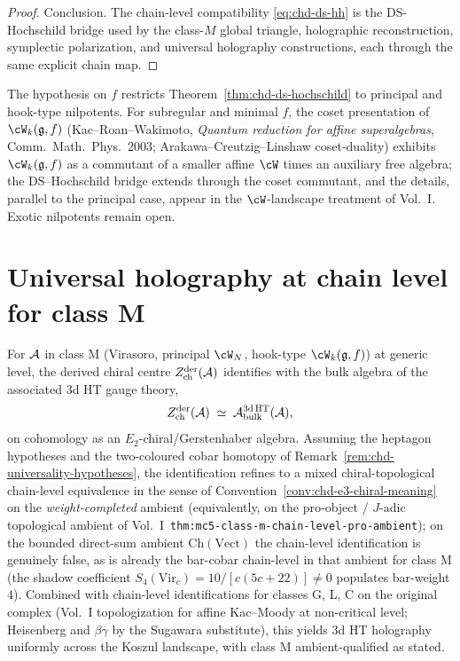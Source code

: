 \begin{proof}
Conclusion. The chain-level compatibility \eqref{eq:chd-ds-hh} is the
DS-Hochschild bridge used by the class-$M$ global triangle,
holographic reconstruction, symplectic polarization, and universal
holography constructions, each through the same explicit chain map.
\end{proof}

\begin{remark}%
\label{rem:chd-nonprincipal-nilpotents}%
The hypothesis on $f$ restricts Theorem~\ref{thm:chd-ds-hochschild} to
principal and hook-type nilpotents. For subregular and minimal $f$,
the coset presentation of $\cW_k(\fg,f)$ (Kac--Roan--Wakimoto,
\emph{Quantum reduction for affine superalgebras}, Comm.~Math.~Phys.\
2003; Arakawa--Creutzig--Linshaw coset-duality) exhibits
$\cW_k(\fg,f)$ as a commutant of a smaller affine $\cW$ times an
auxiliary free algebra; the DS--Hochschild bridge extends through the
coset commutant, and the details, parallel to the principal case,
appear in the $\cW$-landscape treatment of Vol.~I. Exotic nilpotents
remain open.
\end{remark}

\section{Universal holography at chain level for class M}
\label{sec:chd-holography}

\begin{corollary}%
\label{cor:universal-holography-class-M}%
%
For $\mathcal{A}$ in class M (Virasoro, principal $\cW_N$, hook-type
$\cW_k(\fg, f)$) at generic level, the derived chiral centre
$Z^{\mathrm{der}}_{\mathrm{ch}}(\mathcal{A})$ identifies with the bulk algebra
of the associated 3d HT gauge theory,
\[
 Z^{\mathrm{der}}_{\mathrm{ch}}(\mathcal{A}) \;\simeq\;
 \mathcal{A}_{\mathrm{bulk}}^{\mathrm{3d\,HT}}(\mathcal{A}),
\]
on cohomology as an $E_2$-chiral/Gerstenhaber algebra. Assuming the
heptagon hypotheses and the two-coloured cobar homotopy of
Remark~\ref{rem:chd-universality-hypotheses}, the identification
refines to a mixed chiral-topological chain-level equivalence in the
sense of Convention~\ref{conv:chd-e3-chiral-meaning} on the
\emph{weight-completed} ambient (equivalently, on the pro-object /
$J$-adic topological ambient of
Vol.~I~\texttt{thm:mc5-class-m-chain-level-pro-ambient}); on the
bounded direct-sum ambient $\mathrm{Ch}(\mathrm{Vect})$ the
chain-level identification is genuinely false, as is already the
bar-cobar chain-level in that ambient for class M (the shadow
coefficient $S_4(\mathrm{Vir}_c)=10/[c(5c+22)]\ne 0$ populates
bar-weight $4$). Combined with chain-level identifications for
classes G, L, C on the original complex (Vol.~I topologization
for affine Kac--Moody at non-critical level; Heisenberg and
$\beta\gamma$ by the Sugawara substitute), this yields 3d HT
holography uniformly across the Koszul landscape, with class M
ambient-qualified as stated.
\end{corollary}

